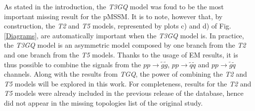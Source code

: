 \documentclass[a4paper,11pt]{article}
\begin{document}
As stated in the introduction, the \textit{T3GQ} model was foud to be the most important missing result for the pMSSM. It is to note, however that, by construction, the \textit{T2} and \textit{T5} models, represented by plots c) and d) of Fig. \ref{Diagrams}, are automatically important when the \textit{T3GQ} model is. In practice, the \textit{T3GQ} model is an asymmetric model composed by one branch from the \textit{T2} and one branch from the \textit{T5} models. Thanks to the usage of EM results, it is thus possible to combine the signals from the $pp \rightarrow \tilde g \tilde g$, $pp \rightarrow \tilde q \tilde q$ and $pp \rightarrow \tilde g \tilde q$ channels. Along with the results from \textit{TGQ}, the power of combining the \textit{T2} and \textit{T5} models will be explored in this work. For completeness, results for the \textit{T2} and \textit{T5} models were already included in the previous release of the database, hence did not appear in the missing topologies list of the original study.
\end{document}
